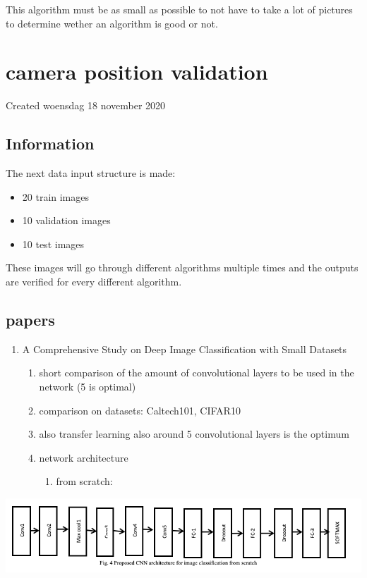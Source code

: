 This algorithm must be as small as possible to not have to take a lot of pictures to determine wether an algorithm is good or not. 

\section{camera position validation}

Created woensdag 18 november 2020



\subsection{Information}

The next data input structure is made:

	\begin{itemize}
	\item 20 train images
	\item 10 validation images
	\item 10 test images
	\end{itemize}


These images will go through different algorithms multiple times and the outputs are verified for every different algorithm.



\subsection{papers}



\begin{enumerate}[1]
\item A Comprehensive Study on Deep Image Classification with Small Datasets
	\begin{enumerate}[a]
	\item short comparison of the amount of convolutional layers to be used in the network (5 is optimal)
	\item comparison on datasets: Caltech101, CIFAR10
	\item also transfer learning also around 5 convolutional layers is the optimum
	\item network architecture
		\begin{enumerate}[1]
		\item from scratch:
		\end{enumerate}
	\end{enumerate}
\end{enumerate}
			\includegraphics[]{./fig/Research/Vision_Algorithm/camera_position_validation/paper1_arch_fromscratch.png}
			

